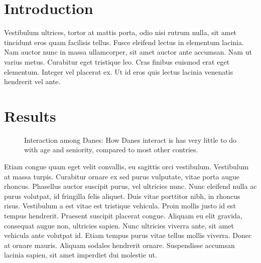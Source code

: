 \documentclass[
  a4paper,
]{scrbook}
\renewcommand*\contentsname{Table of contents}
\newcommand\contentsname{Table of contents}
\begin{document}
\renewcommand*\contentsname{Table of contents}
{
\setcounter{tocdepth}{1}
\tableofcontents
}

\mainmatter
\chapter{Introduction}\label{introduction}

Vestibulum ultrices, tortor at mattis porta, odio nisi rutrum nulla, sit
amet tincidunt eros quam facilisis tellus. Fusce eleifend lectus in
elementum lacinia. Nam auctor nunc in massa ullamcorper, sit amet auctor
ante accumsan. Nam ut varius metus. Curabitur eget tristique leo. Cras
finibus euismod erat eget elementum. Integer vel placerat ex. Ut id eros
quis lectus lacinia venenatis hendrerit vel ante.

\chapter{Results}\label{results}

\begin{figure}[H]


\caption{\label{fig-danish-interaction}Interaction among Danes: How
Danes interact is has very little to do with age and seniority, compared
to most other contries.}

\end{figure}%

Etiam congue quam eget velit convallis, eu sagittis orci vestibulum.
Vestibulum at massa turpis. Curabitur ornare ex sed purus vulputate,
vitae porta augue rhoncus. Phasellus auctor suscipit purus, vel
ultricies nunc. Nunc eleifend nulla ac purus volutpat, id fringilla
felis aliquet. Duis vitae porttitor nibh, in rhoncus risus. Vestibulum a
est vitae est tristique vehicula. Proin mollis justo id est tempus
hendrerit. Praesent suscipit placerat congue. Aliquam eu elit gravida,
consequat augue non, ultricies sapien. Nunc ultricies viverra ante, sit
amet vehicula ante volutpat id. Etiam tempus purus vitae tellus mollis
viverra. Donec at ornare mauris. Aliquam sodales hendrerit ornare.
Suspendisse accumsan lacinia sapien, sit amet imperdiet dui molestie ut.
\end{document}

